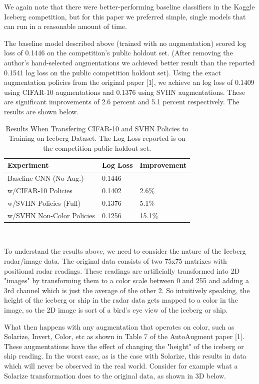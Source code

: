 \documentclass[10pt,twocolumn,letterpaper]{article}
\begin{document}
We again note that there were better-performing baseline classifiers in the Kaggle Iceberg competition, but for this paper we preferred simple, single models that can run in a reasonable amount of time.

The baseline model described above (trained with no augmentation) scored log loss of 0.1446 on the competition's public holdout set. (After removing the author's hand-selected augmentations we achieved better result than the reported 0.1541 log loss on the public competition holdout set). Using the exact augmentation policies from the original paper [1], we achieve an log loss of 0.1409 using CIFAR-10 augmentations and 0.1376 using SVHN augmentations.  These are significant improvements of 2.6 percent and 5.1 percent respectively.  The results are shown below.


    \begin{table}[h]
      \begin{tabular}{lll}
        \hline
        Experiment &Log Loss & Improvement   \\ \hline
        Baseline CNN (No Aug.)  &0.1446 &-\\
        w/CIFAR-10 Policies &0.1402  & 2.6\%\\
        w/SVHN Policies (Full) &0.1376  & 5.1\%\\
        w/SVHN Non-Color Policies &0.1256  &15.1\%\\  
        \hline
      \end{tabular}
      \\
      \caption{Results When Transfering CIFAR-10 and SVHN Policies to Training on Iceberg Dataset.  The Log Loss reported is on the competition public holdout set.}
    \end{table}


To understand the results above, we need to consider the nature of the Iceberg radar/image data.  The original data consists of two 75x75 matrixes with positional radar readings.  These readings are artificially transformed into 2D "images" by transforming them to a color scale between 0 and 255 and adding a 3rd channel which is just the average of the other 2.  So intuitively speaking, the height of the iceberg or ship in the radar data gets mapped to a color in the image, so the 2D image is sort of a bird's eye view of the iceberg or ship.

What then happens with any augmentation that operates on color, such as Solarize, Invert, Color, etc as shown in Table 7 of the AutoAugment paper [1].  These augmentations have the effect of changing the "height" of the iceberg or ship reading.  In the worst case, as is the case with Solarize, this results in data which will never be observed in the real world.  Consider for example what a Solarize transformation does to the original data, as shown in 3D below.
\end{document}
